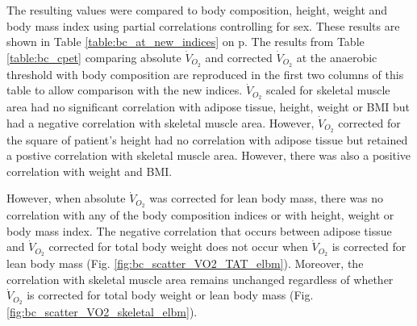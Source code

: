 The resulting values were compared to body composition, height, weight and body mass index using partial correlations controlling for sex. These results are shown in Table \ref{table:bc_at_new_indices} on p\pageref{table:bc_at_new_indices}. The results from Table \ref{table:bc_cpet} comparing absolute $\dot{V}_{O_2}$ and corrected $\dot{V}_{O_2}$ at the anaerobic threshold with body composition are reproduced in the first two columns of this table to allow comparison with the new indices. $\dot{V}_{O_2}$ scaled for skeletal muscle area had no significant correlation with adipose tissue, height, weight or BMI but had a negative correlation with skeletal muscle area. However, $\dot{V}_{O_2}$ corrected for the square of patient's height had no correlation with adipose tissue but retained a postive correlation with skeletal muscle area. However, there was also a positive correlation with weight and BMI. 

However, when absolute $\dot{V}_{O_2}$ was corrected for lean body mass, there was no correlation with any of the body composition indices or with height, weight or body mass index. The negative correlation that occurs between adipose tissue and $\dot{V}_{O_2}$ corrected for total body weight does not occur when $\dot{V}_{O_2}$ is corrected for lean body mass (Fig. \ref{fig:bc_scatter_VO2_TAT_elbm}). Moreover, the correlation with skeletal muscle area remains unchanged regardless of whether $\dot{V}_{O_2}$ is corrected for total body weight or lean body mass (Fig. \ref{fig:bc_scatter_VO2_skeletal_elbm}).

